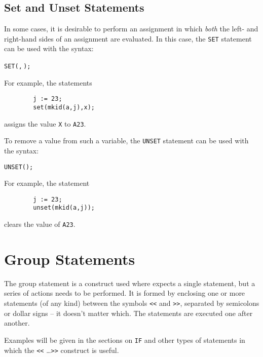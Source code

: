 \subsection{Set and Unset Statements}
\hypertarget{command:SET}{}
\hypertarget{command:UNSET}{}

In some cases, it is desirable to perform an assignment in which \emph{both}
the left- and right-hand sides of an assignment are
evaluated.  In this case, the \texttt{SET} statement can
be used with the syntax:
\begin{syntax}
  \texttt{SET(}\texttt{,}\,\texttt{);}
\end{syntax}
For example, the statements
\begin{verbatim}
        j := 23;
        set(mkid(a,j),x);
\end{verbatim}
assigns the value \texttt{X} to \texttt{A23}.

To remove a value from such a variable, the \texttt{UNSET}
statement can be used with the syntax:
\begin{syntax}
        \texttt{UNSET(}\texttt{);}
\end{syntax}
For example, the statement
\begin{verbatim}
        j := 23;
        unset(mkid(a,j));
\end{verbatim}
clears the value of \texttt{A23}.

\section{Group Statements}

The group statement
 is a construct used where
{\REDUCE} expects a single statement, but a series of actions needs to be
performed.  It is formed by enclosing one or more statements (of any kind)
between the symbols \texttt{<}\texttt{<} and \texttt{>}\texttt{>},
separated by semicolons or
dollar signs -- it doesn't matter which.  The statements are executed one
after another.

Examples will be given in the sections on \texttt{IF} and other
types of statements in which the \texttt{<}\texttt{<} \ldots \texttt{>}\texttt{>}
construct is useful.

